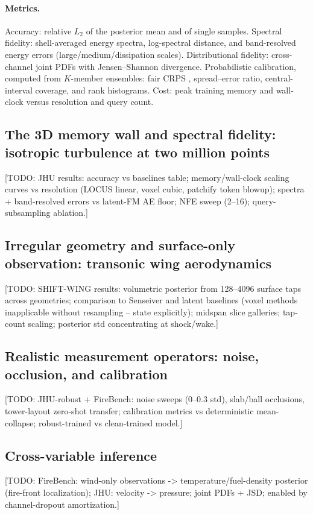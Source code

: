 \documentclass{article} %
\newcommand{\todo}[1]{{\color{red}[TODO: #1]}}
\begin{document}
\paragraph{Metrics.}
Accuracy: relative $L_2$ of the posterior mean and of single samples. Spectral fidelity: shell-averaged energy spectra, log-spectral distance, and band-resolved energy errors (large/medium/dissipation scales). Distributional fidelity: cross-channel joint PDFs with Jensen--Shannon divergence. Probabilistic calibration, computed from $K$-member ensembles: fair CRPS \citep{gneiting2007strictly}, spread--error ratio, central-interval coverage, and rank histograms. Cost: peak training memory and wall-clock versus resolution and query count.

\subsection{The 3D memory wall and spectral fidelity: isotropic turbulence at two million points}
\label{sec:results-scaling}
\todo{JHU results: accuracy vs baselines table; memory/wall-clock scaling curves vs resolution (LOCUS linear, voxel cubic, patchify token blowup); spectra + band-resolved errors vs latent-FM AE floor; NFE sweep (2--16); query-subsampling ablation.}

\subsection{Irregular geometry and surface-only observation: transonic wing aerodynamics}
\label{sec:results-geometry}
\todo{SHIFT-WING results: volumetric posterior from 128--4096 surface taps across geometries; comparison to Senseiver and latent baselines (voxel methods inapplicable without resampling -- state explicitly); midspan slice galleries; tap-count scaling; posterior std concentrating at shock/wake.}

\subsection{Realistic measurement operators: noise, occlusion, and calibration}
\label{sec:results-realism}
\todo{JHU-robust + FireBench: noise sweeps (0--0.3 std), slab/ball occlusions, tower-layout zero-shot transfer; calibration metrics vs deterministic mean-collapse; robust-trained vs clean-trained model.}

\subsection{Cross-variable inference}
\label{sec:results-crossvar}
\todo{FireBench: wind-only observations -> temperature/fuel-density posterior (fire-front localization); JHU: velocity -> pressure; joint PDFs + JSD; enabled by channel-dropout amortization.}
\end{document}
